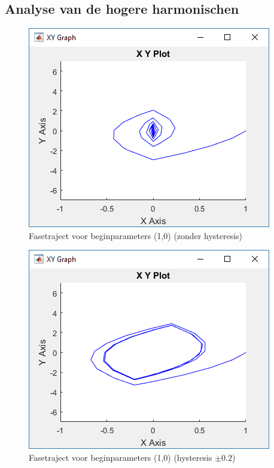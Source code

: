 \documentclass[12pt]{article}
\begin{document}
\subsection{Analyse van de hogere harmonischen}

\begin{figure}[!h]
	\centering
	\includegraphics[height=0.4\textheight, keepaspectratio]{xynohysopgave2.png}
	\caption{Fasetraject voor beginparameters (1,0) (zonder hysteresis)}
	\label{xynohysopgave2}
\end{figure}
\begin{figure}[!h]
	\centering
	\includegraphics[height=0.4\textheight, keepaspectratio]{xyhysopgave2.png}
	\caption{Fasetraject voor beginparameters (1,0) (hysteresis $\pm 0.2$)}
	\label{xyhysopgave2}
\end{figure}
\end{document}
